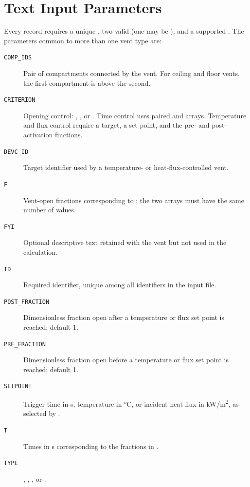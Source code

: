 {{

\section{Text Input Parameters}
\label{info:VENT6}

Every  record requires a unique , two valid  (one may be ), and a supported . The parameters common to more than one vent type are:
\begin{description}
\item[\texttt{COMP\_IDS}] Pair of compartments connected by the vent. For ceiling and floor vents, the first compartment is above the second.
\item[\texttt{CRITERION}] Opening control: , , or . Time control uses paired  and  arrays. Temperature and flux control require a target, a set point, and the pre- and post-activation fractions.
\item[\texttt{DEVC\_ID}] Target identifier used by a temperature- or heat-flux-controlled vent.
\item[\texttt{F}] Vent-open fractions corresponding to ; the two arrays must have the same number of values.
\item[\texttt{FYI}] Optional descriptive text retained with the vent but not used in the calculation.
\item[\texttt{ID}] Required identifier, unique among all identifiers in the input file.
\item[\texttt{POST\_FRACTION}] Dimensionless fraction open after a temperature or flux set point is reached; default 1.
\item[\texttt{PRE\_FRACTION}] Dimensionless fraction open before a temperature or flux set point is reached; default 1.
\item[\texttt{SETPOINT}] Trigger time in s, temperature in \unit{\degreeCelsius}, or incident heat flux in \unit{kW/m^2}, as selected by .
\item[\texttt{T}] Times in s corresponding to the fractions in .
\item[\texttt{TYPE}] , , , or .
\end{description}

}}
